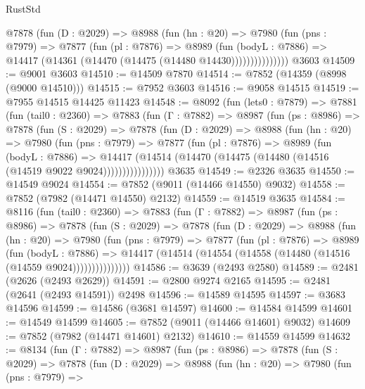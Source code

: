 \begin{lexlean}{RustStd}
\begin{coremodule}
              @7878
                (fun (D : @2029) =>
                @8988
                  (fun (hn : @20) =>
                  @7980
                    (fun (pns : @7979) =>
                    @7877
                      (fun (pl : @7876) =>
                      @8989
                        (fun (bodyL : @7886) =>
                        @14417 (@14361 (@14470 (@14475 (@14480 @14430)))))))))))))))
    @3603
@14509 := @9001 @3603
@14510 := @14509 @7870
@14514 := @7852 (@14359 (@8998 (@9000 @14510)))
@14515 := @7952 @3603
@14516 := @9058 @14515
@14519 := @7955 @14515 @14425 @11423
@14548 := @8092
    (fun (lets0 : @7879) =>
    @7881
      (fun (tail0 : @2360) =>
      @7883
        (fun (Γ : @7882) =>
        @8987
          (fun (ps : @8986) =>
          @7878
            (fun (S : @2029) =>
            @7878
              (fun (D : @2029) =>
              @8988
                (fun (hn : @20) =>
                @7980
                  (fun (pns : @7979) =>
                  @7877
                    (fun (pl : @7876) =>
                    @8989
                      (fun (bodyL : @7886) =>
                      @14417
                        (@14514 (@14470 (@14475 (@14480 (@14516 (@14519 @9022 @9024))))))))))))))))
    @3635
@14549 := @2326 @3635
@14550 := @14549 @9024
@14554 := @7852 (@9011 (@14466 @14550) @9032)
@14558 := @7852 (@7982 (@14471 @14550) @2132)
@14559 := @14519 @3635
@14584 := @8116
    (fun (tail0 : @2360) =>
    @7883
      (fun (Γ : @7882) =>
      @8987
        (fun (ps : @8986) =>
        @7878
          (fun (S : @2029) =>
          @7878
            (fun (D : @2029) =>
            @8988
              (fun (hn : @20) =>
              @7980
                (fun (pns : @7979) =>
                @7877
                  (fun (pl : @7876) =>
                  @8989
                    (fun (bodyL : @7886) =>
                    @14417 (@14514 (@14554 (@14558 (@14480 (@14516 (@14559 @9024)))))))))))))))
@14586 := @3639 (@2493 @2580)
@14589 := @2481 (@2626 (@2493 @2629))
@14591 := @2800 @9274 @2165
@14595 := @2481 (@2641 (@2493 @14591)) @2498
@14596 := @14589 @14595
@14597 := @3683 @14596
@14599 := @14586 (@3681 @14597)
@14600 := @14584 @14599
@14601 := @14549 @14599
@14605 := @7852 (@9011 (@14466 @14601) @9032)
@14609 := @7852 (@7982 (@14471 @14601) @2132)
@14610 := @14559 @14599
@14632 := @8134
    (fun (Γ : @7882) =>
    @8987
      (fun (ps : @8986) =>
      @7878
        (fun (S : @2029) =>
        @7878
          (fun (D : @2029) =>
          @8988
            (fun (hn : @20) =>
            @7980
              (fun (pns : @7979) =>

\end{coremodule}
\end{lexlean}
